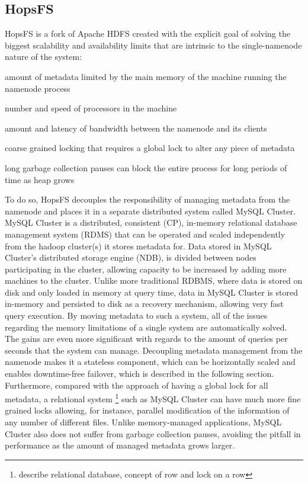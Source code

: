 \subsection{HopsFS}
HopsFS \cite{niazi2016hopsfs} is a fork of Apache HDFS created with the explicit goal of solving the biggest scalability and availability limits that are intrinsic to the single-namenode nature of the system: 
\begin{inparaenum}[i)]
    \item amount of metadata limited by the main memory of the machine running the namenode process
    \item number and speed of processors in the machine
    \item amount and latency of bandwidth between the namenode and its clients
    \item coarse grained locking that requires a global lock to alter any piece of metadata
    \item long garbage collection pauses can block the entire process for long periods of time as heap grows
\end{inparaenum}
To do so, HopsFS decouples the responsibility of managing metadata from the namenode and places it in a separate distributed system called MySQL Cluster.
MySQL Cluster is a distributed, consistent (CP), in-memory relational database management system (RDMS) that can be operated and scaled independently from the hadoop cluster(s) it stores metadata for.
Data stored in MySQL Cluster's distributed storage engine (NDB), is divided between nodes participating in the cluster, allowing capacity to be increased by adding more machines to the cluster.
Unlike more traditional RDBMS, where data is stored on disk and only loaded in memory at query time, data in MySQL Cluster is stored in-memory and persisted to disk as a recovery mechanism, allowing very fast query execution.
By moving metadata to such a system, all of the issues regarding the memory limitations of a single system are automatically solved.
The gains are even more significant with regards to the amount of queries per seconds that the system can manage.
Decoupling metadata management from the namenode makes it a stateless component, which can be horizontally scaled and enables downtime-free failover, which is described in the following section.
Furthermore, compared with the approach of having a global lock for all metadata, a relational system \footnote{describe relational database, concept of row and lock on a row} such as MySQL Cluster can have much more fine grained locks allowing, for instance, parallel modification of the information of any number of different files.
Unlike memory-managed applications, MySQL Cluster also does not suffer from garbage collection pauses, avoiding the pitfall in performance as the amount of managed metadata grows larger.

